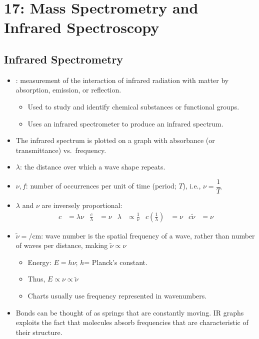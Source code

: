 \chapter{17: Mass Spectrometry and Infrared Spectroscopy}\label{17: Mass Spectrometry and Infrared Spectroscopy}
\section{Infrared Spectrometry}\label{Infared Spectrometry}
\begin{itemize}
  \item {}: measurement of the interaction of infrared radiation with matter by absorption, emission, or reflection.
  \begin{itemize}
    \item Used to study and identify chemical substances or functional groups. 
    \item Uses an infrared spectrometer to produce an infrared spectrum.
  \end{itemize}
  \item The infrared spectrum is plotted on a graph with absorbance (or transmittance) vs.\ frequency.
  \item {} \(\lambda \): the distance over which a wave shape repeats.
  \item {} \(\nu, f \): number of occurrences per unit of time (period; \(T\)), i.e., \(\nu = \dfrac{1}{T}\) 
  \item \(\lambda \) and \(\nu \) are inversely proportional:
  \begin{align*}
    c &= \lambda\nu &
    \frac{c}{\lambda} &= \nu &
    \lambda &\propto \frac{1}{\nu} &
    c\left(\frac{1}{\lambda}\right) &= \nu &
    c\tilde{\nu} &= \nu
  \end{align*}
  \item {} \(\tilde{\nu}=\si{\per\cm} \): wave number is the spatial frequency of a wave, rather than number of waves per distance, making \(\tilde{\nu} \propto \nu \)
  \begin{itemize}
    \item Energy: \(E = h\nu \); \(h\)= Planck's constant.
    \item Thus, \emph{\(E \propto \nu \propto \tilde{\nu}\)}
    \item Charts usually use frequency represented in wavenumbers.
  \end{itemize}
  \item Bonds can be thought of as springs that are constantly moving. IR graphs exploits the fact that molecules absorb frequencies that are characteristic of their structure.

\end{itemize}

